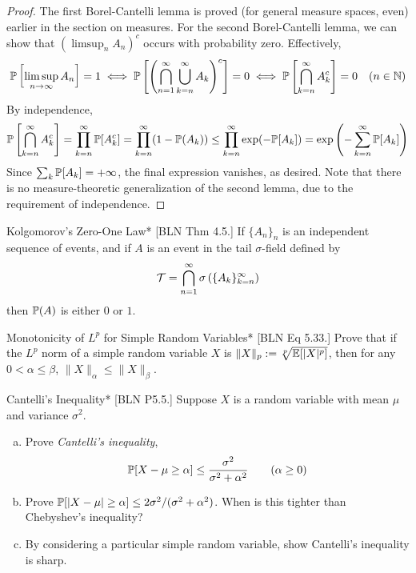 \begin{proof}
    The first Borel-Cantelli lemma is proved (for general measure spaces, even) earlier in the section on measures. For the second Borel-Cantelli lemma, we can show that \((\limsup_n A_n)^c\) occurs with probability zero. Effectively,
    \[
        \mathbb{P}\left[\limsup_{n \to \infty} A_n\right] = 1
        \iff \mathbb{P}\left[ \left(\bigcap_{n=1}^\infty \bigcup_{k=n}^\infty A_k\right)^c \right] = 0
        \iff \mathbb{P}\left[ \bigcap_{k=n}^\infty A_k^c \right] = 0
        \quad (n \in \mathbb{N})
    \]
    By independence,
    \[
        \mathbb{P}\left[ \bigcap_{k =n}^\infty A_k^c \right]
        = \prod_{k=n}^\infty \mathbb{P}[A_k^c]
        = \prod_{k=n}^\infty (1 - \mathbb{P}(A_k))
        \leq \prod_{k=n}^\infty \exp(-\mathbb{P}[A_k])
        = \exp\left( -\sum_{k=n}^\infty \mathbb{P}[A_k] \right)
    \]
    Since \(\sum_k \mathbb{P}[A_k] = +\infty\), the final expression vanishes, as desired. Note that there is no measure-theoretic generalization of the second lemma, due to the requirement of independence.
\end{proof}


\begin{problem}{Kolgomorov's Zero-One Law}*
    [BLN Thm 4.5.] If \(\{A_n\}_n\) is an independent sequence of events, and if \(A\) is an event in the tail \(\sigma\)-field defined by
    \[
        \mathcal{T} = \bigcap_{n=1}^\infty \sigma \left( \{A_k\}_{k=n}^\infty \right)
    \]
    then \(\mathbb{P}(A)\) is either \(0\) or \(1\).
\end{problem}


\begin{problem}{Monotonicity of \(L^p\) for Simple Random Variables}*
    [BLN Eq 5.33.] Prove that if the \(L^p\) norm of a simple random variable \(X\) is \(\|X\|_p := \sqrt[p]{\mathbb{E}[|X|^p]}\), then for any \(0 < \alpha \leq \beta\), \(\|X\|_\alpha \leq \|X\|_\beta\).
\end{problem}


\begin{problem}{Cantelli's Inequality}*
    [BLN P5.5.] Suppose \(X\) is a random variable with mean \(\mu\) and variance \(\sigma^2\).
    \begin{enumerate}[(a)]
        \itemsep0em
        \item Prove \emph{Cantelli's inequality},
        \[
            \mathbb{P}[X - \mu \geq \alpha] \leq \frac{\sigma^2}{\sigma^2 + \alpha^2}
            \qquad (\alpha \geq 0)
        \]
        \item Prove \(\mathbb{P}[|X - \mu| \geq \alpha] \leq 2\sigma^2 / (\sigma^2 + \alpha^2)\). When is this tighter than Chebyshev's inequality?
        \item By considering a particular simple random variable, show Cantelli's inequality is sharp.
    \end{enumerate}
\end{problem}

